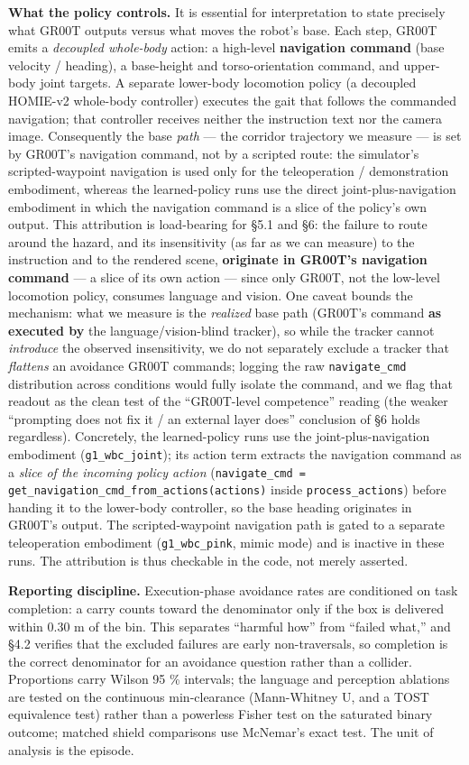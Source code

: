 \documentclass{article}
\begin{document}
\textbf{What the policy controls.} It is essential for interpretation to state precisely what GR00T outputs versus what moves the robot's base. Each step, GR00T emits a \emph{decoupled whole-body} action: a high-level \textbf{navigation command} (base velocity / heading), a base-height and torso-orientation command, and upper-body joint targets. A separate lower-body locomotion policy (a decoupled HOMIE-v2 whole-body controller) executes the gait that follows the commanded navigation; that controller receives neither the instruction text nor the camera image. Consequently the base \emph{path} --- the corridor trajectory we measure --- is set by GR00T's navigation command, not by a scripted route: the simulator's scripted-waypoint navigation is used only for the teleoperation / demonstration embodiment, whereas the learned-policy runs use the direct joint-plus-navigation embodiment in which the navigation command is a slice of the policy's own output. This attribution is load-bearing for \S5.1 and \S6: the failure to route around the hazard, and its insensitivity (as far as we can measure) to the instruction and to the rendered scene, \textbf{originate in GR00T's navigation command} --- a slice of its own action --- since only GR00T, not the low-level locomotion policy, consumes language and vision. One caveat bounds the mechanism: what we measure is the \emph{realized} base path (GR00T's command \textbf{as executed by} the language/vision-blind tracker), so while the tracker cannot \emph{introduce} the observed insensitivity, we do not separately exclude a tracker that \emph{flattens} an avoidance GR00T commands; logging the raw \texttt{navigate\_cmd} distribution across conditions would fully isolate the command, and we flag that readout as the clean test of the ``GR00T-level competence'' reading (the weaker ``prompting does not fix it / an external layer does'' conclusion of \S6 holds regardless). Concretely, the learned-policy runs use the joint-plus-navigation embodiment (\texttt{g1\_wbc\_joint}); its action term extracts the navigation command as a \emph{slice of the incoming policy action} (\texttt{navigate\_cmd = get\_navigation\_cmd\_from\_actions(actions)} inside \texttt{process\_actions}) before handing it to the lower-body controller, so the base heading originates in GR00T's output. The scripted-waypoint navigation path is gated to a separate teleoperation embodiment (\texttt{g1\_wbc\_pink}, mimic mode) and is inactive in these runs. The attribution is thus checkable in the code, not merely asserted.

\textbf{Reporting discipline.} Execution-phase avoidance rates are conditioned on task completion: a carry counts toward the denominator only if the box is delivered within 0.30 m of the bin. This separates ``harmful how'' from ``failed what,'' and \S4.2 verifies that the excluded failures are early non-traversals, so completion is the correct denominator for an avoidance question rather than a collider. Proportions carry Wilson 95 \% intervals; the language and perception ablations are tested on the continuous min-clearance (Mann-Whitney U, and a TOST equivalence test) rather than a powerless Fisher test on the saturated binary outcome; matched shield comparisons use McNemar's exact test. The unit of analysis is the episode.
\end{document}
